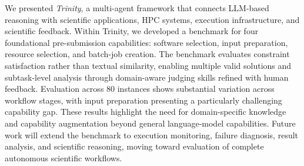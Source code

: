 \documentclass[conference]{IEEEtran}
\begin{document}
We presented \textit{Trinity}, a multi-agent framework that connects LLM-based reasoning with scientific applications, HPC systems, execution infrastructure, and scientific feedback. Within Trinity, we developed a benchmark for four foundational pre-submission capabilities: software selection, input preparation, resource selection, and batch-job creation. The benchmark evaluates constraint satisfaction rather than textual similarity, enabling multiple valid solutions and subtask-level analysis through domain-aware judging skills refined with human feedback. Evaluation across 80 instances shows substantial variation across workflow stages, with input preparation presenting a particularly challenging capability gap. These results highlight the need for domain-specific knowledge and capability augmentation beyond general language-model capabilities. Future work will extend the benchmark to execution monitoring, failure diagnosis, result analysis, and scientific reasoning, moving toward evaluation of complete autonomous scientific workflows.


%






\end{document}

